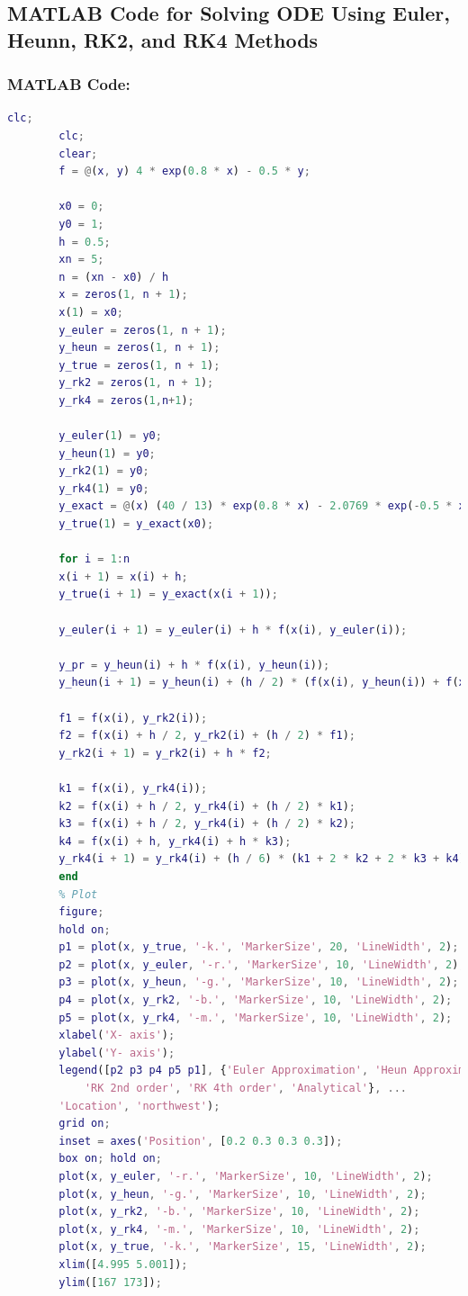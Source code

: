 \documentclass[a4paper,12pt]{article}
\begin{document}
	
	\newpage
	\subsection{MATLAB Code for Solving ODE Using Euler, Heunn, RK2, and RK4 Methods}
	
	\subsubsection{MATLAB Code:}
\begin{lstlisting}[language=Matlab, caption=MATLAB Code for Solving ODE using different Methods]
	clc;
		clc;
		clear;
		f = @(x, y) 4 * exp(0.8 * x) - 0.5 * y;
		
		x0 = 0;
		y0 = 1;
		h = 0.5;
		xn = 5;
		n = (xn - x0) / h
		x = zeros(1, n + 1);
		x(1) = x0;
		y_euler = zeros(1, n + 1);
		y_heun = zeros(1, n + 1);
		y_true = zeros(1, n + 1);
		y_rk2 = zeros(1, n + 1);
		y_rk4 = zeros(1,n+1);
	
		y_euler(1) = y0;
		y_heun(1) = y0;
		y_rk2(1) = y0;
		y_rk4(1) = y0;
		y_exact = @(x) (40 / 13) * exp(0.8 * x) - 2.0769 * exp(-0.5 * x);
		y_true(1) = y_exact(x0);
		
		for i = 1:n
		x(i + 1) = x(i) + h;
		y_true(i + 1) = y_exact(x(i + 1));
		
		y_euler(i + 1) = y_euler(i) + h * f(x(i), y_euler(i));
	
		y_pr = y_heun(i) + h * f(x(i), y_heun(i));
		y_heun(i + 1) = y_heun(i) + (h / 2) * (f(x(i), y_heun(i)) + f(x(i + 1), y_pr));
		
		f1 = f(x(i), y_rk2(i));
		f2 = f(x(i) + h / 2, y_rk2(i) + (h / 2) * f1);
		y_rk2(i + 1) = y_rk2(i) + h * f2;
		
		k1 = f(x(i), y_rk4(i));
		k2 = f(x(i) + h / 2, y_rk4(i) + (h / 2) * k1);
		k3 = f(x(i) + h / 2, y_rk4(i) + (h / 2) * k2);
		k4 = f(x(i) + h, y_rk4(i) + h * k3);
		y_rk4(i + 1) = y_rk4(i) + (h / 6) * (k1 + 2 * k2 + 2 * k3 + k4);
		end
		% Plot 
		figure;
		hold on;
		p1 = plot(x, y_true, '-k.', 'MarkerSize', 20, 'LineWidth', 2);          
		p2 = plot(x, y_euler, '-r.', 'MarkerSize', 10, 'LineWidth', 2);        
		p3 = plot(x, y_heun, '-g.', 'MarkerSize', 10, 'LineWidth', 2);         
		p4 = plot(x, y_rk2, '-b.', 'MarkerSize', 10, 'LineWidth', 2);          
		p5 = plot(x, y_rk4, '-m.', 'MarkerSize', 10, 'LineWidth', 2);          
		xlabel('X- axis');
		ylabel('Y- axis');
		legend([p2 p3 p4 p5 p1], {'Euler Approximation', 'Heun Approximation', ...
			'RK 2nd order', 'RK 4th order', 'Analytical'}, ...
		'Location', 'northwest');
		grid on;
		inset = axes('Position', [0.2 0.3 0.3 0.3]);
		box on; hold on;
		plot(x, y_euler, '-r.', 'MarkerSize', 10, 'LineWidth', 2);
		plot(x, y_heun, '-g.', 'MarkerSize', 10, 'LineWidth', 2);
		plot(x, y_rk2, '-b.', 'MarkerSize', 10, 'LineWidth', 2);
		plot(x, y_rk4, '-m.', 'MarkerSize', 10, 'LineWidth', 2);
		plot(x, y_true, '-k.', 'MarkerSize', 15, 'LineWidth', 2);
		xlim([4.995 5.001]);
		ylim([167 173]);
	\end{lstlisting}
	
\end{document}

